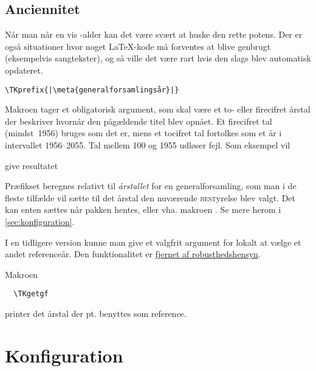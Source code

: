 \documentclass[a4paper,article,oneside,danish]{memoir}
\newenvironment{resultat}{%
  \begin{adjustwidth}{15mm}{15mm}%
    \begin{qshade}%
    }{%
    \end{qshade}%
  \end{adjustwidth}}
\begin{document}

\subsection{Anciennitet}
\label{sec:anciennitet}

Når man når en vis \TK-alder kan det være svært at huske den rette
potens. Der er også situationer hvor noget \LaTeX-kode må forventes at
blive genbrugt (eksempelvis sangtekster), og så ville det være rart
hvis den slags blev automatisk opdateret.

\begin{lstlisting}[escapechar=|]
  \TKprefix{|\meta{generalforsamlingsår}|}
\end{lstlisting}

Makroen  tager et obligatorisk argument, som skal være et
to- eller firecifret årstal der beskriver hvornår den pågældende titel
blev opnået. Et firecifret tal (mindst~1956) bruges som det er, mens
et tocifret tal fortolkes som et år i intervallet 1956--2055. Tal
mellem 100 og 1955 udløser fejl. Som eksempel vil


give resultatet

\begin{resultat}

\end{resultat}

Præfikset beregnes relativt til \emph{årstallet} for en
generalforsamling, som man i de fleste tilfælde vil sætte til det
årstal den nuværende \textsc{best}yrelse blev valgt. Det kan enten
sættes når pakken hentes, eller vha. makroen . Se mere
herom i \vref{sec:konfiguration}.

I en tidligere version kunne man give  et valgfrit
argument for lokalt at vælge et andet referenceår. Den funktionalitet
er \hyperref[sec:-og-]{fjernet af robusthedshensyn}.

Makroen
\begin{lstlisting}
  \TKgetgf
\end{lstlisting}
printer det årstal der pt. benyttes som reference.


\section{Konfiguration}
\label{sec:konfiguration}
\end{document}
